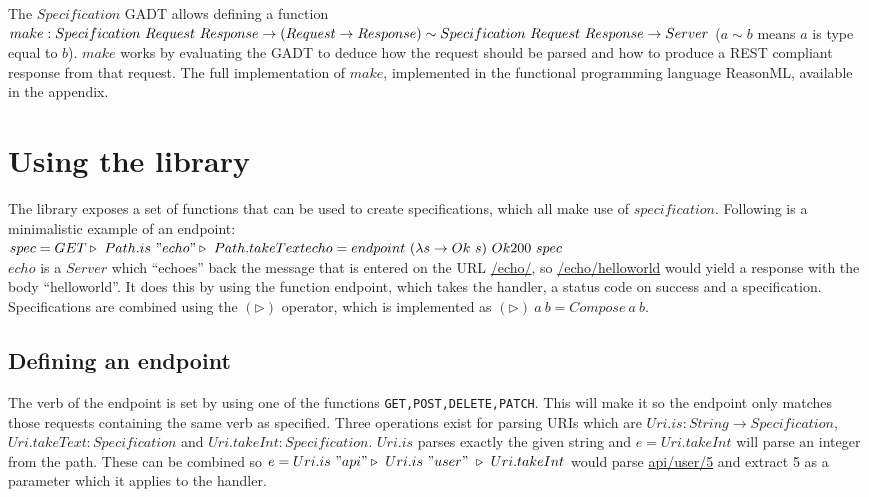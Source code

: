 The $Specification$ GADT allows defining a function\\ $make : Specification\
Request\ Response \rightarrow (Request \rightarrow Response) \sim\\
Specification\ Request\ Response \rightarrow Server$ ($a\sim b$ means $a$ is
type equal to $b$).  $make$ works by evaluating the GADT to deduce how the
request should be parsed and how to produce a REST compliant response from that
request.  The full implementation of $make$, implemented in the functional
programming language ReasonML, available in the appendix.

\section{Using the library}

The library exposes a set of functions that can be used to create
specifications, which all make use of $specification$. Following is a
minimalistic example of an endpoint:\\

\noindent
\begin{math}
spec = GET \triangleright\ Path.is\ "echo" \triangleright\ Path.takeText\\
echo = endpoint\ (\lambda s \rightarrow Ok\ s)\ Ok200\ spec
\end{math}\\

$echo$ is a $Server$ which ``echoes'' back the message that is entered on the
URL \url{/echo/}, so \url{/echo/helloworld} would yield a response with the body
``helloworld''. It does this by using the function endpoint, which takes the
handler, a status code on success and a specification.  Specifications are
combined using the $(\triangleright )$ operator, which is implemented as
$(\triangleright)\ a\ b = Compose\ a\ b$.

\subsection{Defining an endpoint}

The verb of the endpoint is set by using one of the functions
\texttt{GET,POST,DELETE,PATCH}. This will make it so the endpoint only matches
those requests containing the same verb as specified.  Three operations exist
for parsing URIs which are $Uri.is : String \rightarrow Specification$,
$Uri.takeText : Specification$ and $Uri.takeInt: Specification$. $Uri.is$ parses
exactly the given string and $e = Uri.takeInt$ will parse an integer from the
path.  These can be combined so $e = Uri.is\ "api" \triangleright\ Uri.is\
"user"\ \triangleright\ Uri.takeInt$ would parse \url{api/user/5} and extract 5
as a parameter which it applies to the handler.

